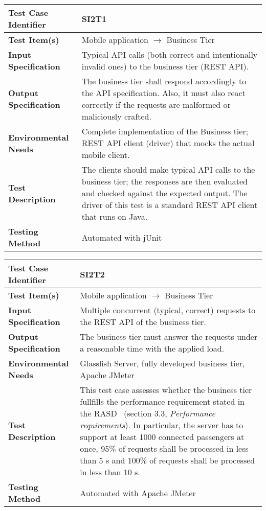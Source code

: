 \begin{tabular}{l p{}}
    \hline
    \textbf{Test Case Identifier} & SI2T1\\
    \hline
    \textbf{Test Item(s)} & Mobile application $\rightarrow$ Business Tier\\
    \hline
    \textbf{Input Specification} & Typical API calls (both correct and intentionally invalid ones) to the business tier (REST API).\\
    \hline
    \textbf{Output Specification} & The business tier shall respond accordingly to the API specification. Also, it must also react correctly if the requests are malformed or maliciously crafted.\\
    \hline
    \textbf{Environmental Needs} & Complete implementation of the Business tier; REST API client (driver) that mocks the actual mobile client. \\
    \hline
    \textbf{Test Description} & The clients should make typical API calls to the business tier; the responses are then evaluated and checked against the expected output. The driver of this test is a standard REST API client that runs on Java.\\
    \hline
    \textbf{Testing Method} & Automated with jUnit \\
    \hline
\end{tabular}

\vspace{2em}

\noindent\begin{tabular}{l p{}}
    \hline
    \textbf{Test Case Identifier} & SI2T2\\
    \hline
    \textbf{Test Item(s)} & Mobile application $\rightarrow$ Business Tier\\
    \hline
    \textbf{Input Specification} & Multiple concurrent (typical, correct) requests to the REST API of the business tier.\\
    \hline
    \textbf{Output Specification} & The business tier must answer the requests under a reasonable time with the applied load. \\
    \hline
    \textbf{Environmental Needs} & Glassfish Server, fully developed business tier, Apache JMeter\\
    \hline
    \textbf{Test Description} & This test case assesses whether the business tier fullfills the performance requirement stated in the RASD~\cite{mytaxi-rasd} (section 3.3, \emph{Performance requirements}). In particular, the server has to support at least 1000 connected passengers at once, 95\% of requests shall be processed in less than 5 s and 100\% of requests shall be processed in less than 10 s.\\
    \hline
    \textbf{Testing Method} & Automated with Apache JMeter \\
    \hline
\end{tabular}

